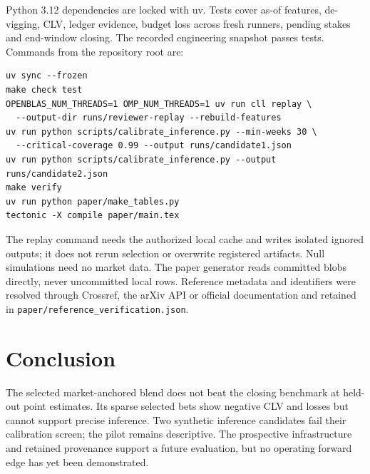 \documentclass[11pt]{article}
\begin{document}
Python 3.12 dependencies are locked with uv. Tests cover as-of features, de-vigging, CLV,
ledger evidence, budget loss across fresh runners, pending stakes and end-window closing.
The recorded engineering snapshot passes \testsPassed{} tests. Commands from the repository
root are:
\begin{verbatim}
uv sync --frozen
make check test
OPENBLAS_NUM_THREADS=1 OMP_NUM_THREADS=1 uv run cll replay \
  --output-dir runs/reviewer-replay --rebuild-features
uv run python scripts/calibrate_inference.py --min-weeks 30 \
  --critical-coverage 0.99 --output runs/candidate1.json
uv run python scripts/calibrate_inference.py --output runs/candidate2.json
make verify
uv run python paper/make_tables.py
tectonic -X compile paper/main.tex
\end{verbatim}
The replay command needs the authorized local cache and writes isolated ignored outputs;
it does not rerun selection or overwrite registered artifacts. Null simulations need no
market data. The paper generator reads committed blobs directly, never uncommitted local
rows. Reference metadata and identifiers were resolved through Crossref, the arXiv API or
official documentation and retained in \texttt{paper/reference\_verification.json}.

\section{Conclusion}
The selected market-anchored blend does not beat the closing benchmark at held-out point
estimates. Its sparse selected bets show negative CLV and losses but cannot support precise
inference. Two synthetic inference candidates fail their calibration screen; the pilot remains
descriptive. The prospective infrastructure
and retained provenance support a future evaluation, but no operating forward edge has yet
been demonstrated.



\end{document}
